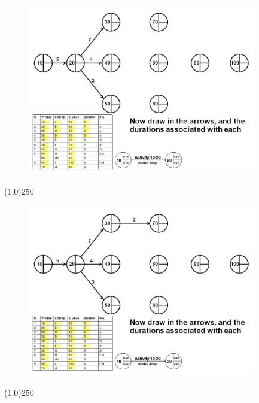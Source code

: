 \begin{frame}
\begin{figure}
	\centering
		\includegraphics[width = 10.0cm]{oldnotes/Slide94.jpg}
\end{figure}
\end{frame}
\begin{center}\line(1,0){250}\end{center}


\begin{frame}
\begin{figure}
	\centering
		\includegraphics[width = 10.0cm]{oldnotes/Slide95.jpg}
\end{figure}
\end{frame}
\begin{center}\line(1,0){250}\end{center}


